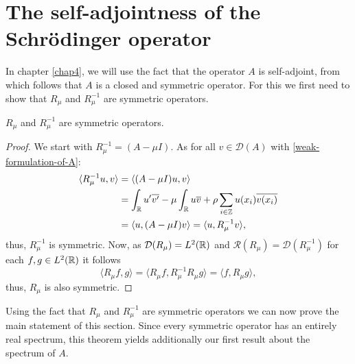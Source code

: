 \section{The self-adjointness of the Schrödinger operator}

In chapter \ref{chap4}, we will use the fact that the operator $A$ is self-adjoint, from which follows that $A$ is a closed and symmetric operator. For this we first need to show that $R_{\mu}$ and $R_{\mu}^{-1}$ are symmetric operators.
\begin{theorem} \label{2.2:thm-RmuSymmetric}
	$R_{\mu}$ and $R_{\mu}^{-1}$ are symmetric operators.
	
	\begin{proof}
		We start with $R_{\mu}^{-1} = (A - \mu I)$. As for all $v \in \mathcal{D}(A)$ with \eqref{weak-formulation-of-A}:
			\begin{align*}
				\langle R_{\mu}^{-1} u, v \rangle & = \langle (A - \mu I) u, v \rangle \\
					& = \int_{\mathbb{R}} u'\overline{v'} -  \mu \int_{\mathbb{R}} u \overline{v} + \rho \sum_{i \in \mathbb{Z}} u(x_{i}) \overline{v(x_{i})} \\
					& = \langle u, (A - \mu I) v \rangle = \langle u,  R_{\mu}^{-1} v \rangle,
			\end{align*}
		thus, $R_{\mu}^{-1}$ is symmetric. Now, as $\mathcal{D}(R_{\mu}) = L^{2}(\mathbb{R})$ and $\mathcal{R}(R_{\mu}) = \mathcal{D}(R_{\mu}^{-1})$ for each $f, g \in L^{2}(\mathbb{R})$ it follows
		\[  \langle R_{\mu} f, g \rangle =  \langle R_{\mu} f, R_{\mu}^{-1} R_{\mu} g \rangle = \langle f, R_{\mu} g \rangle, \]
		thus, $R_{\mu}$ is also symmetric.
	\end{proof}
\end{theorem}

Using the fact that $R_{\mu}$ and $R_{\mu}^{-1}$ are symmetric operators we can now prove the main statement of this section. Since every symmetric operator has an entirely real spectrum, this theorem yields additionally our first result about the spectrum of $A$.

